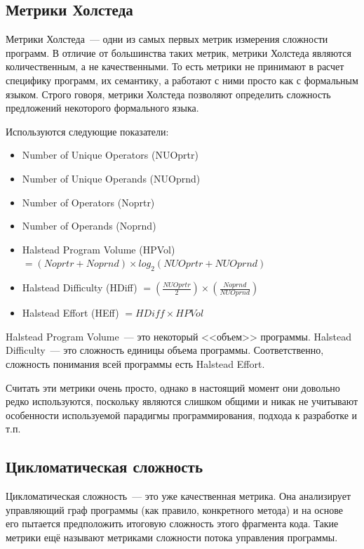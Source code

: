\documentclass{../../text-style}
\begin{document}
\subsection{Метрики Холстеда}

Метрики Холстеда~--- одни из самых первых метрик измерения сложности программ. В отличие от большинства таких метрик, метрики Холстеда являются количественным, а не качественными. То есть метрики не принимают в расчет специфику программ, их семантику, а работают с ними просто как с формальным языком. Строго говоря, метрики Холстеда позволяют определить сложность предложений некоторого формального языка. 

Используются следующие показатели:

\begin{itemize}
    \item Number of Unique Operators (NUOprtr)
    \item Number of Unique Operands (NUOprnd)
    \item Number of Operators (Noprtr)
    \item Number of Operands (Noprnd)
    \item Halstead Program Volume (HPVol) $= (Noprtr + Noprnd) \times log_2(NUOprtr + NUOprnd)$
    \item Halstead Difficulty (HDiff) $= (\frac{NUOprtr}{2}) \times (\frac{Noprnd}{NUOprnd})$
    \item Halstead Effort (HEff) $= HDiff \times HPVol$
\end{itemize}

Halstead Program Volume~--- это некоторый <<объем>> программы. Halstead Difficulty~--- это сложность единицы объема программы. Соответственно, сложность понимания всей программы есть Halstead Effort.

Считать эти метрики очень просто, однако в настоящий момент они довольно редко используются, поскольку являются слишком общими и никак не учитывают особенности используемой парадигмы программирования, подхода к разработке и т.п.

\subsection{Цикломатическая сложность}

Цикломатическая сложность~--- это уже качественная метрика. Она анализирует управляющий граф программы (как правило, конкретного метода) и на основе его пытается предположить итоговую сложность этого фрагмента кода. Такие метрики ещё называют метриками сложности потока управления программы.
\end{document}

